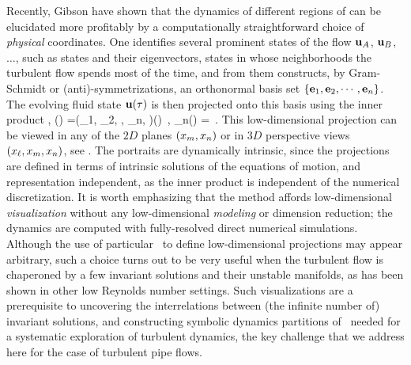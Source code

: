 Recently, Gibson \etal{} have shown that the dynamics of different regions
of {\statesp} can be elucidated more profitably by a computationally
straight\-forward choice of \emph{physical} coordinates. One identifies
several prominent states of the flow ${\bf u}_A$, ${\bf u}_B$, $\dots$, such as
{\eqv} states and their eigenvectors, states in whose neighborhoods the
turbulent flow spends most of the time, and from them constructs, by
Gram-Schmidt or (anti)-symmetrizations, an orthonormal basis set
$\{{\bf e}_1, {\bf e}_2, \cdots, {\bf e}_n\}$. The evolving fluid state ${\bf u}(\tau)$
is then projected onto this basis using the inner product
,
\beq
\ssp(\zeit) =(\ssp_1, \ssp_2, \cdots, \ssp_n, \cdots)(\zeit)
    \,,\qquad
\ssp_n(\zeit) = 
\,.
This low-dimensional projection can be viewed in any of the $2D$ planes
$(x_m, x_n)$ or in $3D$ perspective views $(x_{\ell},x_m,
x_n)$, see . The {\stateDsp} portraits are
{dynamically intrinsic}, since the projections are defined in terms of
intrinsic solutions of the equations of motion, and {representation
independent}, as the inner product  is independent of
the numerical discretization. It is worth emphasizing that the method
affords low-dimensional {\em visualization} without any low-dimensional
{\em modeling} or dimension reduction; the dynamics are computed with
fully-resolved direct numerical simulations. Although the use of
particular \reqva\ to define low-dimensional projections
may appear arbitrary, such a choice turns out to be
very useful when the turbulent flow is chaperoned by a few invariant
solutions and their unstable manifolds, as has been shown in other low
Reynolds number settings. Such visualizations are a
prerequisite to uncovering the interrelations between (the infinite
number of) invariant solutions, and constructing symbolic dynamics
partitions of \statesp\ needed for a systematic exploration of turbulent
dynamics, the key challenge that we address here for the case of turbulent
pipe flows.

